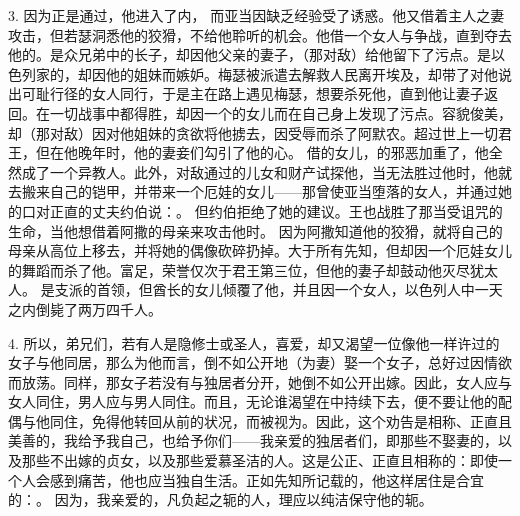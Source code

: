 3. 因为正是通过，他进入了内， 而亚当因缺乏经验受了诱惑。他又借着主人之妻攻击，但若瑟洞悉他的狡猾，不给他聆听的机会。他借一个女人与争战，直到夺去他的。是众兄弟中的长子，却因他父亲的妻子，（那对敌）给他留下了污点。是以色列家的，却因他的姐妹而嫉妒。梅瑟被派遣去解救人民离开埃及，却带了对他说出可耻行径的女人同行，于是主在路上遇见梅瑟，想要杀死他，直到他让妻子返回。在一切战事中都得胜，却因一个的女儿而在自己身上发现了污点。容貌俊美，却（那对敌）因对他姐妹的贪欲将他掳去，因受辱而杀了阿默农。超过世上一切君王，但在他晚年时，他的妻妾们勾引了他的心。 借的女儿，的邪恶加重了，他全然成了一个异教人。此外，对敌通过的儿女和财产试探他，当无法胜过他时，他就去搬来自己的铠甲，并带来一个厄娃的女儿——那曾使亚当堕落的女人，并通过她的口对正直的丈夫约伯说：。 但约伯拒绝了她的建议。王也战胜了那当受诅咒的生命，当他想借着阿撒的母亲来攻击他时。 因为阿撒知道他的狡猾，就将自己的母亲从高位上移去，并将她的偶像砍碎扔掉。大于所有先知，但却因一个厄娃女儿的舞蹈而杀了他。富足，荣誉仅次于君王第三位，但他的妻子却鼓动他灭尽犹太人。 是支派的首领，但酋长的女儿倾覆了他，并且因一个女人，以色列人中一天之内倒毙了两万四千人。\par

4. 所以，弟兄们，若有人是隐修士或圣人，喜爱，却又渴望一位像他一样许过的女子与他同居，那么为他而言，倒不如公开地（为妻）娶一个女子，总好过因情欲而放荡。同样，那女子若没有与独居者分开，她倒不如公开出嫁。因此，女人应与女人同住，男人应与男人同住。而且，无论谁渴望在中持续下去，便不要让他的配偶与他同住，免得他转回从前的状况，而被视为。因此，这个劝告是相称、正直且美善的，我给予我自己，也给予你们——我亲爱的独居者们，即那些不娶妻的，以及那些不出嫁的贞女，以及那些爱慕圣洁的人。这是公正、正直且相称的：即使一个人会感到痛苦，他也应当独自生活。正如先知所记载的，他这样居住是合宜的：。 因为，我亲爱的，凡负起之轭的人，理应以纯洁保守他的轭。\par

